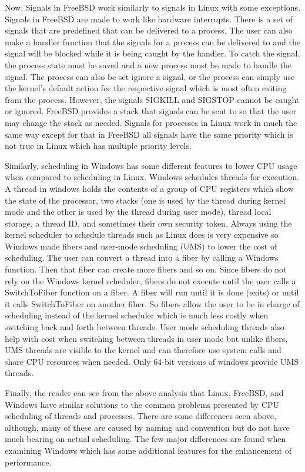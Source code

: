 \documentclass[letterpaper,10pt,draftclsnofoot,onecolumn,]{IEEEtran}
\begin{document}
Now, Signals in FreeBSD work similarly to signals in Linux with some exceptions. Signals in FreeBSD are made to work like hardware interrupts. There is a set of signals that are predefined that can be delivered to a process. The user can also make a handler function that the signals for a process can be delivered to and the signal will be blocked while it is being caught by the handler. To catch the signal, the process state must be saved and a new process must be made to handle the signal. The process can also be set ignore a signal, or the process can simply use the kernel's default action for the respective signal which is most often exiting from the process. However, the signals SIGKILL and SIGSTOP cannot be caught or ignored. FreeBSD provides a stack that signals can be sent to so that the user may change the stack as needed. Signals for processes in Linux work in much the same way except for that in FreeBSD all signals have the same priority which is not true in Linux which has multiple priority levels.

Similarly, scheduling in Windows has some different features to lower CPU usage when compared to scheduling in Linux. Windows schedules threads for execution. A thread in windows holds the contents of a group of CPU registers which show the state of the processor, two stacks (one is used by the thread during kernel mode and the other is used by the thread during user mode), thread local storage, a thread ID, and sometimes their own security token. Always using the kernel scheduler to schedule threads such as Linux does is very expensive so Windows made fibers and user-mode scheduling (UMS) to lower the cost of scheduling. The user can convert a thread into a fiber by calling a Windows function. Then that fiber can create more fibers and so on. Since fibers do not rely on the Windows kernel scheduler, fibers do not execute until the user calls a SwitchToFiber function on a fiber. A fiber will run until it is done (exits) or until it calls SwitchToFiber on another fiber. So fibers allow the user to be in charge of scheduling instead of the kernel scheduler which is much less costly when switching back and forth between threads. User mode scheduling threads also help with cost when switching between threads in user mode but unlike fibers, UMS threads are visible to the kernel and can therefore use system calls and share CPU resources when needed. Only 64-bit versions of windows provide UMS threads.

Finally, the reader can see from the above analysis that Linux, FreeBSD, and Windows have similar solutions to the common problems presented by CPU scheduling of threads and processes. There are some differences seen above, although, many of these are caused by naming and convention but do not have much bearing on actual scheduling. The few major differences are found when examining Windows which has some additional features for the enhancement of performance.
\end{document}
